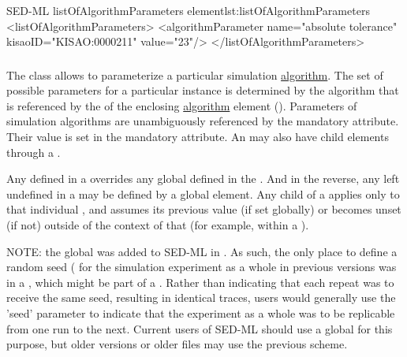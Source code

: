 \begin{myXmlLst}{SED-ML listOfAlgorithmParameters element}{lst:listOfAlgorithmParameters}
<listOfAlgorithmParameters>
	<algorithmParameter name="absolute tolerance" kisaoID="KISAO:0000211" value="23"/> 
</listOfAlgorithmParameters>
\end{myXmlLst}


\subsubsection{}
\label{class:algorithmParameter}
The  class allows to parameterize a particular simulation \hyperref[class:algorithm]{algorithm}. The set of possible parameters for a particular instance is determined by the algorithm that is referenced by the  of the enclosing \hyperref[class:algorithm]{algorithm} element (). Parameters of simulation algorithms are unambiguously referenced by the mandatory \hyperref[sec:kisaoid]{} attribute. Their value is set in the mandatory \hyperref[sec:algorithmParameterValue]{} attribute.  An \AlgorithmParameter may also have child \AlgorithmParameter elements through a \ListOfAlgorithmParameters.

Any \AlgorithmParameter defined in a \Simulation overrides any global \AlgorithmParameter defined in the \SedDocument.  And in the reverse, any \AlgorithmParameter left undefined in a \Simulation may be defined by a global \AlgorithmParameter element.  Any \AlgorithmParameter child of a \Simulation applies only to that individual \Simulation, and assumes its previous value (if set globally) or becomes unset (if not) outside of the context of that \Simulation (for example, within a \RepeatedTask).

NOTE:  the global \ListOfAlgorithmParameters was added to SED-ML in \currentLV.  As such, the only place to define a random seed ( for the simulation experiment as a whole in previous versions was in a \Simulation, which might be part of a \RepeatedTask.  Rather than indicating that each repeat was to receive the same seed, resulting in identical traces, users would generally use the 'seed' parameter to indicate that the experiment as a whole was to be replicable from one run to the next.  Current users of SED-ML should use a global \AlgorithmParameter for this purpose, but older versions or older files may use the previous scheme.

